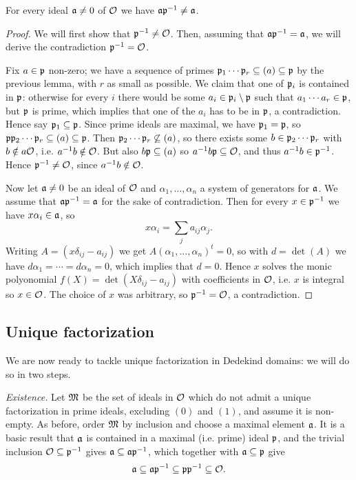 \begin{lem}
	For every ideal $\mathfrak{a}\neq 0$ of $\mathcal{O}$ we have $\mathfrak{a}\mathfrak{p}^{-1}\neq\mathfrak{a}$.
\end{lem}
\begin{proof}
	We will first show that $\mathfrak{p}^{-1}\neq\mathcal{O}$. Then, assuming that $\mathfrak{a}\mathfrak{p}^{-1}=\mathfrak{a}$, we will derive the contradiction $\mathfrak{p}^{-1}=\mathcal{O}$.

	Fix $a\in\mathfrak{p}$ non-zero; we have a sequence of primes $\mathfrak{p}_1\cdots\mathfrak{p}_r\subseteq (a)\subseteq\mathfrak{p}$ by the previous lemma, with $r$ as small as possible. We claim that one of $\mathfrak{p}_i$ is contained in $\mathfrak{p}$: otherwise for every $i$ there would be some $a_i\in\mathfrak{p}_i\setminus\mathfrak{p}$ such that $a_1\cdots a_r\in\mathfrak{p}$, but $\mathfrak{p}$ is prime, which implies that one of the $a_i$ has to be in $\mathfrak{p}$, a contradiction. Hence say $\mathfrak{p}_1\subseteq\mathfrak{p}$. Since prime ideals are maximal, we have $\mathfrak{p}_1=\mathfrak{p}$, so $\mathfrak{p}\mathfrak{p}_2\cdots\mathfrak{p}_r\subseteq(a)\subseteq\mathfrak{p}$. Then $\mathfrak{p}_2\cdots\mathfrak{p}_r\not\subseteq(a)$, so there exists some $b\in\mathfrak{p}_2\cdots\mathfrak{p}_r$ with $b\notin a\mathcal{O}$, i.e. $a^{-1} b\notin\mathcal{O}$. But also $b\mathfrak{p}\subseteq(a)$ so $a^{-1} b\mathfrak{p}\subseteq\mathcal{O}$, and thus $a^{-1} b\in\mathfrak{p}^{-1}$. Hence $\mathfrak{p}^{-1}\neq\mathcal{O}$, since $a^{-1} b\notin\mathcal{O}$.

	Now let $\mathfrak{a}\neq 0$ be an ideal of $\mathcal{O}$ and $\alpha_1,\dots,\alpha_n$ a system of generators for $\mathfrak{a}$. We assume that $\mathfrak{a}\mathfrak{p}^{-1}=\mathfrak{a}$ for the sake of contradiction. Then for every $x\in\mathfrak{p}^{-1}$ we have $x\alpha_i\in\mathfrak{a}$, so
	\[
		x\alpha_i = \sum_j a_{ij}\alpha_j.
	\]
	Writing $A=(x\delta_{ij} - a_{ij})$ we get $A(\alpha_1,\dots,\alpha_n)^t=0$, so with $d=\det(A)$ we have $d\alpha_1=\cdots=d\alpha_n=0$, which implies that $d=0$. Hence $x$ solves the monic polyonomial $f(X)=\det(X\delta_{ij}-a_{ij})$ with coefficients in $\mathcal{O}$, i.e. $x$ is integral so $x\in\mathcal{O}$. The choice of $x$ was arbitrary, so $\mathfrak{p}^{-1}=\mathcal{O}$, a contradiction.
	
\end{proof}

\subsection{Unique factorization}

We are now ready to tackle unique factorization in Dedekind domains: we will do so in two steps.

\emph{Existence.} Let $\mathfrak{M}$ be the set of ideals in $\mathcal{O}$ which do not admit a unique factorization in prime ideals, excluding $(0)$ and $(1)$, and assume it is non-empty. As before, order $\mathfrak{M}$ by inclusion and choose a maximal element $\mathfrak{a}$. It is a basic result that $\mathfrak{a}$ is contained in a maximal (i.e. prime) ideal $\mathfrak{p}$, and the trivial inclusion $\mathcal{O}\subseteq\mathfrak{p}^{-1}$ gives $\mathfrak{a}\subseteq\mathfrak{a}\mathfrak{p}^{-1}$, which together with $\mathfrak{a}\subseteq\mathfrak{p}$ give
\[
	\mathfrak{a}\subseteq\mathfrak{a}\mathfrak{p}^{-1}\subseteq\mathfrak{p}\mathfrak{p}^{-1}\subseteq\mathcal{O}.
\]

